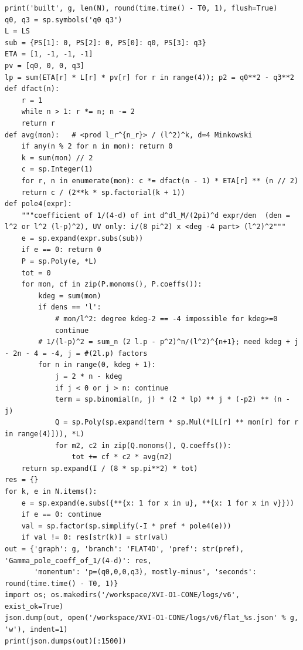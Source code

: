 \documentclass[10pt]{article}
\begin{document}
\begin{lstlisting}
print('built', g, len(N), round(time.time() - T0, 1), flush=True)
q0, q3 = sp.symbols('q0 q3')
L = LS
sub = {PS[1]: 0, PS[2]: 0, PS[0]: q0, PS[3]: q3}
ETA = [1, -1, -1, -1]
pv = [q0, 0, 0, q3]
lp = sum(ETA[r] * L[r] * pv[r] for r in range(4)); p2 = q0**2 - q3**2
def dfact(n):
    r = 1
    while n > 1: r *= n; n -= 2
    return r
def avg(mon):   # <prod l_r^{n_r}> / (l^2)^k, d=4 Minkowski
    if any(n % 2 for n in mon): return 0
    k = sum(mon) // 2
    c = sp.Integer(1)
    for r, n in enumerate(mon): c *= dfact(n - 1) * ETA[r] ** (n // 2)
    return c / (2**k * sp.factorial(k + 1))
def pole4(expr):
    """coefficient of 1/(4-d) of int d^dl_M/(2pi)^d expr/den  (den = l^2 or l^2 (l-p)^2), UV only: i/(8 pi^2) x <deg -4 part> (l^2)^2"""
    e = sp.expand(expr.subs(sub))
    if e == 0: return 0
    P = sp.Poly(e, *L)
    tot = 0
    for mon, cf in zip(P.monoms(), P.coeffs()):
        kdeg = sum(mon)
        if dens == 'l':
            # mon/l^2: degree kdeg-2 == -4 impossible for kdeg>=0
            continue
        # 1/(l-p)^2 = sum_n (2 l.p - p^2)^n/(l^2)^{n+1}; need kdeg + j - 2n - 4 = -4, j = #(2l.p) factors
        for n in range(0, kdeg + 1):
            j = 2 * n - kdeg
            if j < 0 or j > n: continue
            term = sp.binomial(n, j) * (2 * lp) ** j * (-p2) ** (n - j)
            Q = sp.Poly(sp.expand(term * sp.Mul(*[L[r] ** mon[r] for r in range(4)])), *L)
            for m2, c2 in zip(Q.monoms(), Q.coeffs()):
                tot += cf * c2 * avg(m2)
    return sp.expand(I / (8 * sp.pi**2) * tot)
res = {}
for k, e in N.items():
    e = sp.expand(e.subs({**{x: 1 for x in u}, **{x: 1 for x in v}}))
    if e == 0: continue
    val = sp.factor(sp.simplify(-I * pref * pole4(e)))
    if val != 0: res[str(k)] = str(val)
out = {'graph': g, 'branch': 'FLAT4D', 'pref': str(pref), 'Gamma_pole_coeff_of_1/(4-d)': res,
       'momentum': 'p=(q0,0,0,q3), mostly-minus', 'seconds': round(time.time() - T0, 1)}
import os; os.makedirs('/workspace/XVI-O1-CONE/logs/v6', exist_ok=True)
json.dump(out, open('/workspace/XVI-O1-CONE/logs/v6/flat_%s.json' % g, 'w'), indent=1)
print(json.dumps(out)[:1500])
\end{lstlisting}
\end{document}
